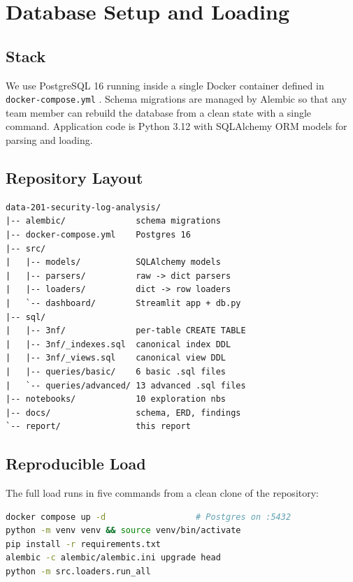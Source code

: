 \section{Database Setup and Loading}
\label{sec:dbsetup}

\subsection{Stack}
We use PostgreSQL 16 \cite{postgresql} running inside a single Docker
container defined in \texttt{docker-compose.yml} \cite{docker}. Schema
migrations are managed by Alembic \cite{alembic} so that any team
member can rebuild the database from a clean state with a single
command. Application code is Python 3.12 with SQLAlchemy ORM models
for parsing and loading.

\subsection{Repository Layout}
\begin{lstlisting}[basicstyle=\ttfamily\scriptsize, frame=none, language={}]
data-201-security-log-analysis/
|-- alembic/              schema migrations
|-- docker-compose.yml    Postgres 16
|-- src/
|   |-- models/           SQLAlchemy models
|   |-- parsers/          raw -> dict parsers
|   |-- loaders/          dict -> row loaders
|   `-- dashboard/        Streamlit app + db.py
|-- sql/
|   |-- 3nf/              per-table CREATE TABLE
|   |-- 3nf/_indexes.sql  canonical index DDL
|   |-- 3nf/_views.sql    canonical view DDL
|   |-- queries/basic/    6 basic .sql files
|   `-- queries/advanced/ 13 advanced .sql files
|-- notebooks/            10 exploration nbs
|-- docs/                 schema, ERD, findings
`-- report/               this report
\end{lstlisting}

\subsection{Reproducible Load}
The full load runs in five commands from a clean clone of the
repository:

\begin{lstlisting}[language=bash, basicstyle=\ttfamily\small, frame=single]
docker compose up -d                  # Postgres on :5432
python -m venv venv && source venv/bin/activate
pip install -r requirements.txt
alembic -c alembic/alembic.ini upgrade head
python -m src.loaders.run_all
\end{lstlisting}

